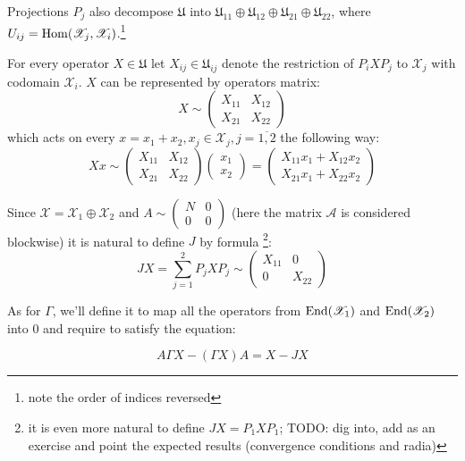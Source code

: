 \documentclass{article}
\begin{document}
Projections \( P_j \) also decompose \( \mathfrak U \) into
\( \mathfrak U_{11} \oplus \mathfrak U_{12} \oplus \mathfrak U_{21} \oplus \mathfrak U_{22} \),
where \( U_{ij} = \mathrm{Hom}({\mathscr X_j},{\mathscr X_i}) \).\footnote{note the order of indices reversed}

For every operator \( X\in\mathfrak U \)
let \( X_{ij} \in \mathfrak U_{ij} \) denote the restriction of \( P_i X P_j \) to \( \mathscr X_j \) with codomain \( \mathscr X_i \).
\( X \) can be represented by operators matrix:
\[X \sim \begin{pmatrix}
    X_{11} & X_{12} \\
    X_{21} & X_{22}
\end{pmatrix}\]
which acts on every \( x = x_1 + x_2, x_j\in\mathscr X_j,j=\overline{1,2} \) the following way:
\[
X x \sim
\begin{pmatrix}
    X_{11} & X_{12} \\
    X_{21} & X_{22}
\end{pmatrix}
\begin{pmatrix} x_1 \\ x_2 \end{pmatrix}
= \begin{pmatrix}
    X_{11} x_1 + X_{12} x_2 \\
    X_{21} x_1 + X_{22} x_2
\end{pmatrix}
\]

Since \( \mathscr X = \mathscr X_1 \oplus \mathscr X_2 \) and \( A \sim \begin{pmatrix} N & 0 \\ 0 & 0 \end{pmatrix} \)
(here the matrix \( \mathcal A \) is considered blockwise)
it is natural to define \( J \) by formula
    \footnote{it is even more natural to define \( JX=P_1XP_1 \);
    TODO: dig into, add as an exercise and point the expected results (convergence conditions and radia)}:
\[JX = \sum_{j=1}^2 P_j X P_j \sim \begin{pmatrix} X_{11} & 0 \\ 0 & X_{22} \end{pmatrix}\]

As for \( \Gamma \), we'll define it to map
all the operators from \( \mathrm{End}({\mathscr X_1}) \) and \( \mathrm{End}({\mathscr X_2}) \) into \( 0 \)
and require to satisfy the equation:

\begin{equation}
\label{eq:gammadef}
    A\Gamma X - (\Gamma X) A = X - JX
\end{equation}
\end{document}
